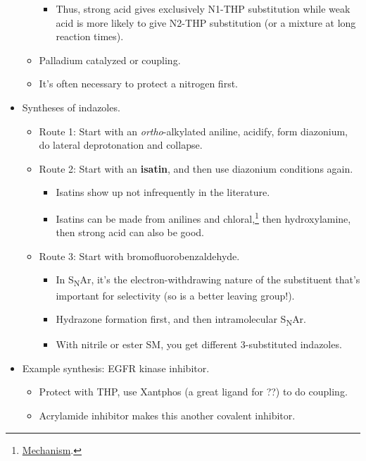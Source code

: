\documentclass[../notes.tex]{subfiles}
\begin{document}
\begin{itemize}
\begin{itemize}
\begin{itemize}
            \item Thus, strong acid gives exclusively N1-THP substitution while weak acid is more likely to give N2-THP substitution (or a mixture at long reaction times).
        \end{itemize}
        \item Palladium catalyzed  or  coupling.
        \item It's often necessary to protect a nitrogen first.
    \end{itemize}
    \item Syntheses of indazoles.
    \begin{itemize}
        \item Route 1: Start with an \emph{ortho}-alkylated aniline, acidify, form diazonium, do lateral deprotonation and collapse.
        \item Route 2: Start with an \textbf{isatin}, and then use diazonium conditions again.
        \begin{itemize}
            \item Isatins show up not infrequently in the literature.
            \item Isatins can be made from anilines and chloral,\footnote{\href{https://synarchive.com/named-reactions/sandmeyer-isatin-synthesis}{Mechanism}.} then hydroxylamine, then strong acid can also be good.
        \end{itemize}
        \item Route 3: Start with bromofluorobenzaldehyde.
        \begin{itemize}
            \item In S\textsubscript{N}Ar, it's the electron-withdrawing nature of the substituent that's important for selectivity (so  is a better leaving group!).
            \item Hydrazone formation first, and then intramolecular S\textsubscript{N}Ar.
            \item With nitrile or ester SM, you get different 3-substituted indazoles.
        \end{itemize}
    \end{itemize}
    \item Example synthesis: EGFR kinase inhibitor.
    \begin{itemize}
        \item Protect with THP, use Xantphos (a great ligand for ??) to do  coupling.
        \item Acrylamide inhibitor makes this another covalent inhibitor.

\end{itemize}
\end{itemize}
\end{document}
